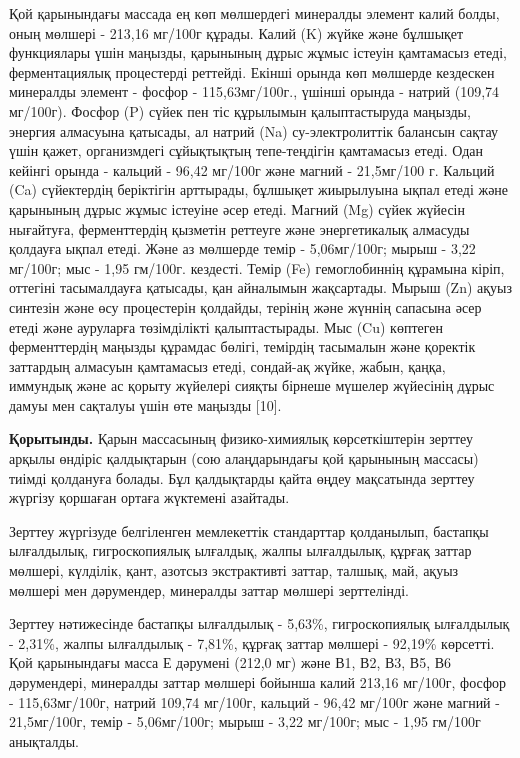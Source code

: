 \begin{multicols}{2}
Қой қарынындағы массада ең көп мөлшердегі минералды элемент калий болды,
оның мөлшері - 213,16 мг/100г құрады. Калий (K) жүйке және бұлшықет
функциялары үшін маңызды, қарынының дұрыс жұмыс істеуін қамтамасыз
етеді, ферментациялық процестерді реттейді. Екінші орында көп мөлшерде
кездескен минералды элемент - фосфор - 115,63мг/100г., үшінші орында -
натрий (109,74 мг/100г). Фосфор (P) сүйек пен тіс құрылымын
қалыптастыруда маңызды, энергия алмасуына қатысады, ал натрий (Na)
су-электролиттік балансын сақтау үшін қажет, организмдегі сұйықтықтың
тепе-теңдігін қамтамасыз етеді. Одан кейінгі орында - кальций - 96,42
мг/100г және магний - 21,5мг/100 г. Кальций (Ca) сүйектердің беріктігін
арттырады, бұлшықет жиырылуына ықпал етеді және қарынының дұрыс жұмыс
істеуіне әсер етеді. Магний (Mg) сүйек жүйесін нығайтуға, ферменттердің
қызметін реттеуге және энергетикалық алмасуды қолдауға ықпал етеді. Және
аз мөлшерде темір - 5,06мг/100г; мырыш - 3,22 мг/100г; мыс - 1,95
гм/100г. кездесті. Темір (Fe) гемоглобиннің құрамына кіріп, оттегіні
тасымалдауға қатысады, қан айналымын жақсартады. Мырыш (Zn) ақуыз
синтезін және өсу процестерін қолдайды, терінің және жүннің сапасына
әсер етеді және ауруларға төзімділікті қалыптастырады. Мыс (Cu) көптеген
ферменттердің маңызды құрамдас бөлігі, темірдің тасымалын және қоректік
заттардың алмасуын қамтамасыз етеді, сондай-ақ жүйке, жабын, қаңқа,
иммундық және ас қорыту жүйелері сияқты бірнеше мүшелер жүйесінің дұрыс
дамуы мен сақталуы үшін өте маңызды {[}10{]}.

{\bfseries Қорытынды.} Қарын массасының физико-химиялық көрсеткіштерін
зерттеу арқылы өндіріс қалдықтарын (сою алаңдарындағы қой қарынының
массасы) тиімді қолдануға болады. Бұл қалдықтарды қайта өңдеу мақсатында
зерттеу жүргізу қоршаған ортаға жүктемені азайтады.

Зерттеу жүргізуде белгіленген мемлекеттік стандарттар қолданылып,
бастапқы ылғалдылық, гигроскопиялық ылғалдық, жалпы ылғалдылық, құрғақ
заттар мөлшері, күлділік, қант, азотсыз экстрактивті заттар, талшық,
май, ақуыз мөлшері мен дәрумендер, минералды заттар мөлшері зерттелінді.

Зерттеу нәтижесінде бастапқы ылғалдылық - 5,63\%, гигроскопиялық
ылғалдылық - 2,31\%, жалпы ылғалдылық - 7,81\%, құрғақ заттар мөлшері -
92,19\% көрсетті. Қой қарынындағы масса Е дәрумені (212,0 мг) және В1,
В2, В3, В5, В6 дәрумендері, минералды заттар мөлшері бойынша калий
213,16 мг/100г, фосфор - 115,63мг/100г, натрий 109,74 мг/100г, кальций -
96,42 мг/100г және магний - 21,5мг/100г, темір - 5,06мг/100г; мырыш -
3,22 мг/100г; мыс - 1,95 гм/100г анықталды.


\end{multicols}
